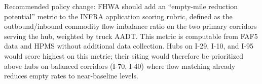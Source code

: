 Recommended policy change: FHWA should add an ``empty-mile reduction potential'' metric to the INFRA application scoring rubric, defined as the outbound/inbound commodity flow imbalance ratio on the two primary corridors serving the hub, weighted by truck AADT. This metric is computable from FAF5 data \citep{FAF5_2023} and HPMS \citep{HPMS2018} without additional data collection. Hubs on I-29, I-10, and I-95 would score highest on this metric; their siting would therefore be prioritized above hubs on balanced corridors (I-70, I-40) where flow matching already reduces empty rates to near-baseline levels.
